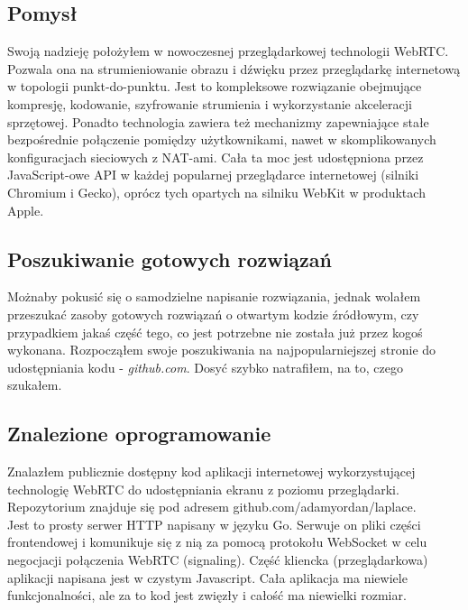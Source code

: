 \documentclass[a4paper,11pt]{article}
\begin{document}
        \subsection{Pomysł}
        Swoją nadzieję położyłem w nowoczesnej przeglądarkowej technologii WebRTC. Pozwala ona na strumieniowanie obrazu i dźwięku przez przeglądarkę internetową w topologii punkt-do-punktu. 
        Jest to kompleksowe rozwiązanie obejmujące kompresję, kodowanie, szyfrowanie strumienia i wykorzystanie akceleracji sprzętowej.
        Ponadto technologia zawiera też mechanizmy zapewniające stałe bezpośrednie połączenie pomiędzy użytkownikami, nawet w skomplikowanych konfiguracjach sieciowych z NAT-ami.
        Cała ta moc jest udostępniona przez JavaScript-owe API w każdej popularnej przeglądarce internetowej (silniki Chromium i Gecko), oprócz tych opartych na silniku WebKit w produktach Apple. 
        \subsection{Poszukiwanie gotowych rozwiązań}
        Możnaby pokusić się o samodzielne napisanie rozwiązania, jednak wolałem przeszukać zasoby gotowych rozwiązań o otwartym kodzie źródłowym,
        czy przypadkiem jakaś część tego, co jest potrzebne nie została już przez kogoś wykonana.
        Rozpocząłem swoje poszukiwania na najpopularniejszej stronie do udostępniania kodu - \emph{github.com}. Dosyć szybko natrafiłem, na to, czego szukałem.
        \subsection{Znalezione oprogramowanie}
        Znalazłem publicznie dostępny kod aplikacji internetowej wykorzystującej technologię WebRTC do udostępniania ekranu z poziomu przeglądarki. \\
        Repozytorium znajduje się pod adresem github.com/adamyordan/laplace. \\
        Jest to prosty serwer HTTP napisany w języku Go. 
        Serwuje on pliki części frontendowej i komunikuje się z nią za pomocą protokołu WebSocket w celu negocjacji połączenia WebRTC (signaling). 
        Część kliencka (przeglądarkowa) aplikacji napisana jest w czystym Javascript. Cała aplikacja ma niewiele funkcjonalności, ale za to kod jest zwięzły i całość ma niewielki rozmiar.
\end{document}
